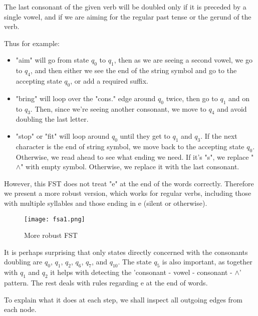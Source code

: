 \documentclass[11pt,journal]{article}
\begin{document}
	The last consonant of the given verb will be doubled only if it is preceded by a single vowel, and if we are aiming for the regular past tense or the gerund of the verb.
	
	Thus for example:
	
	\begin{itemize}
		\item "aim" will go from state $q_0$ to $q_1$, then as we are seeing a second vowel, we go to $q_4$, and then either we see the end of the string symbol and go to the accepting state $q_0$, or add a required suffix.
		\item "bring" will loop over the "cons." edge around $q_0$ twice, then go to $q_1$ and on to $q_3$. Then, since we're seeing another consonant, we move to $q_4$ and avoid doubling the last letter.
		\item "stop" or "fit" will loop around $q_0$ until they get to $q_1$ and $q_3$. If the next character is the end of string symbol, we move back to the accepting state $q_0$. Otherwise, we read ahead to see what ending we need. If it's "s", we replace "$\wedge$" with empty symbol. Otherwise, we replace it with the last consonant.
	\end{itemize}

	However, this FST does not treat "e" at the end of the words correctly. Therefore we present a more robust version, which works for regular verbs, including those with multiple syllables and those ending in e (silent or otherwise).
	
	\begin{figure}[h]
		\texttt{[image: fsa1.png]}
		\caption{More robust FST}
	\end{figure}

	It is perhaps surprising that only states directly concerned with the consonants doubling are $q_0$, $q_1$, $q_2$, $q_6$, $q_7$, and $q_{10}$. The state $q_5$ is also important, as together with $q_1$ and $q_2$ it helps with detecting the 'consonant - vowel - consonant - $\wedge$' pattern. The rest deals with rules regarding e at the end of words.
	
	To explain what it does at each step, we shall inspect all outgoing edges from each node.
	
\end{document}
